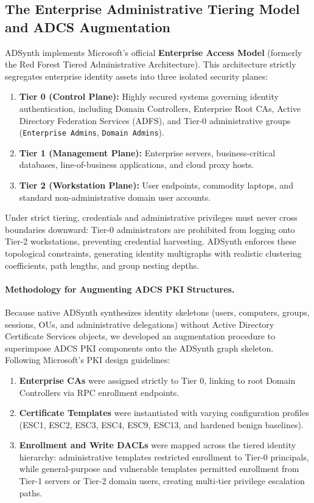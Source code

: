 \subsection{The Enterprise Administrative Tiering Model and ADCS Augmentation}
ADSynth implements Microsoft's official \textbf{Enterprise Access Model} (formerly the Red Forest Tiered Administrative Architecture). This architecture strictly segregates enterprise identity assets into three isolated security planes:
\begin{enumerate}
    \item \textbf{Tier 0 (Control Plane):} Highly secured systems governing identity authentication, including Domain Controllers, Enterprise Root CAs, Active Directory Federation Services (ADFS), and Tier-0 administrative groups (\texttt{Enterprise Admins}, \texttt{Domain Admins}).
    \item \textbf{Tier 1 (Management Plane):} Enterprise servers, business-critical databases, line-of-business applications, and cloud proxy hosts.
    \item \textbf{Tier 2 (Workstation Plane):} User endpoints, commodity laptops, and standard non-administrative domain user accounts.
\end{enumerate}

Under strict tiering, credentials and administrative privileges must never cross boundaries downward: Tier-0 administrators are prohibited from logging onto Tier-2 workstations, preventing credential harvesting. ADSynth enforces these topological constraints, generating identity multigraphs with realistic clustering coefficients, path lengths, and group nesting depths.

\paragraph{Methodology for Augmenting ADCS PKI Structures.}
Because native ADSynth synthesizes identity skeletons (users, computers, groups, sessions, OUs, and administrative delegations) without Active Directory Certificate Services objects, we developed an augmentation procedure to superimpose ADCS PKI components onto the ADSynth graph skeleton. Following Microsoft's PKI design guidelines:
\begin{enumerate}
    \item \textbf{Enterprise CAs} were assigned strictly to Tier 0, linking to root Domain Controllers via RPC enrollment endpoints.
    \item \textbf{Certificate Templates} were instantiated with varying configuration profiles (ESC1, ESC2, ESC3, ESC4, ESC9, ESC13, and hardened benign baselines).
    \item \textbf{Enrollment and Write DACLs} were mapped across the tiered identity hierarchy: administrative templates restricted enrollment to Tier-0 principals, while general-purpose and vulnerable templates permitted enrollment from Tier-1 servers or Tier-2 domain users, creating multi-tier privilege escalation paths.
\end{enumerate}

